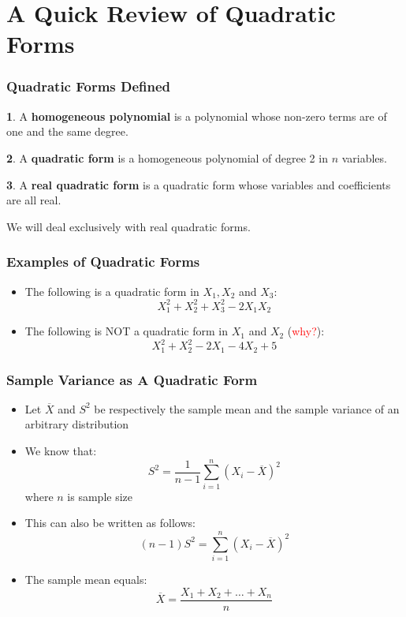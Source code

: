 \documentclass[10pt]{beamer}
\theoremstyle{definition}
\newtheorem{definition}{\translate{Definition}}
\begin{document}
\section{A Quick Review of Quadratic Forms}
\begin{frame}[fragile]
\frametitle{Quadratic Forms Defined}
\begin{definition}
	A \textbf{homogeneous polynomial} is a polynomial whose non-zero terms are of one and the same degree.
\end{definition}

\begin{definition}
	A \textbf{quadratic form} is a homogeneous polynomial of degree 2 in $n$ variables.
\end{definition}

\begin{definition}
	A \textbf{real quadratic form} is a quadratic form whose variables and coefficients are all real.
\end{definition}

We will deal exclusively with real quadratic forms.
\end{frame}

\begin{frame}[fragile]
\frametitle{Examples of Quadratic Forms}
\begin{itemize}
	\item The following is a quadratic form in $X_{1},X_{2}$ and $X_{3}$:
	\[
		X_{1}^{2} + X_{2}^{2} + X_{3}^{2} - 2X_{1}X_{2}
	\]
	\item The following is NOT a quadratic form in $X_{1}$ and $X_{2}$ (\textcolor{red}{why?}):
	\[
		X_{1}^{2} + X_{2}^{2} - 2X_{1} - 4X_{2} + 5
	\]
\end{itemize}
\end{frame}

\begin{frame}[fragile]
\frametitle{Sample Variance as A Quadratic Form}
\begin{itemize}
	\item Let $\overline{X}$ and $S^{2}$ be respectively the sample mean and the sample variance of an arbitrary distribution
	\item We know that:
	\[
		S^{2} = \frac{1}{n-1}\sum_{i=1}^{n}(X_{i} - \overline{X})^{2}
	\]
	where $n$ is sample size
	\item This can also be written as follows:
	\[
		(n-1)S^{2} = \sum_{i=1}^{n}(X_{i} - \overline{X})^{2}
	\]
	\item The sample mean equals:
	\[
		\overline{X} = \frac{X_{1} + X_{2} + \ldots + X_{n}}{n}
	\]
\end{itemize}
\end{frame}
\end{document}
